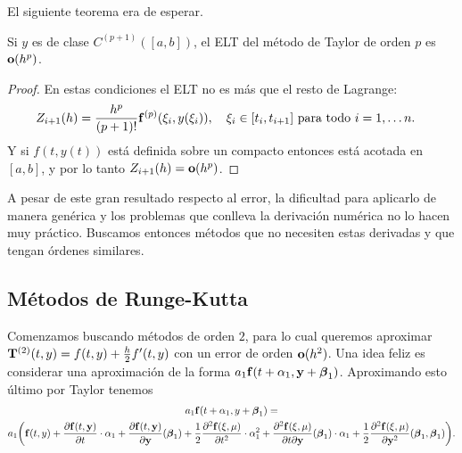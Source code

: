 
El siguiente teorema era de esperar.

\begin{theorem}
    Si $y$ es de clase $C^{(p+1)}([a, b])$,
    el ELT del método de Taylor de orden $p$ es $\vb{o}(h^p)$.
\end{theorem}

\begin{proof}
    En estas condiciones el ELT no es más que el resto de Lagrange:
    \begin{equation*}
        Z_{i+1}(h) = \frac{h^p}{(p+1)!} \vf^{(p)}(\xi_i, y(\xi_i)),
            \qq{$\xi_i \in [t_i, t_{i+1}]$ para todo $i = 1,\ldots n$.}
    \end{equation*}
    Y si $f(t, y(t))$ está definida sobre un compacto
    entonces está acotada en $[a,b]$,
    y por lo tanto $Z_{i+1}(h) = \vb{o}(h^p)$.
\end{proof}


A pesar de este gran resultado respecto al error,
la dificultad para aplicarlo de manera genérica y
los problemas que conlleva la derivación numérica no lo hacen muy práctico.
Buscamos entonces métodos que no necesiten estas derivadas
y que tengan órdenes similares.

\subsection{Métodos de Runge-Kutta}

\newcommand{\vbeta}{\vb*{\beta}}

Comenzamos buscando métodos de orden $2$,
para lo cual queremos aproximar
$\vb{T}^{(2)}(t, y) = f(t,y) + \frac{h}{2} f'(t,y)$
con un error de orden $\vb{o}(h^2)$.
Una idea feliz es considerar una aproximación de la forma
$a_1\vf(t + \alpha_1, \vy + \vbeta_1)$.
Aproximando esto último por Taylor tenemos
\begin{multline*}
    a_1\vf(t + \alpha_1, y + \vbeta_1) = \\
    a_1\qty(
        \vf(t,y) +
        \pdv{\vf(t, \vy)}{t} \cdot \alpha_1 +
        \pdv{\vf(t, \vy)}{\vy} \qty(\vbeta_1) +
        \frac{1}{2}\pdv[2]{\vf(\xi, \mu)}{t} \cdot \alpha_1^2 +
        \pdv{\vf(\xi, \mu)}{t}{\vy} \qty(\vbeta_1) \cdot \alpha_1 +
        \frac{1}{2}\pdv[2]{\vf(\xi, \mu)}{\vy} \qty(\vbeta_1, \vbeta_1)
    ).
\end{multline*}

